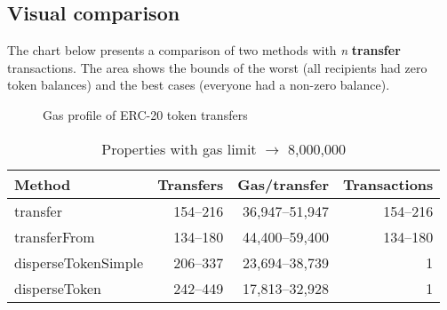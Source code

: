 \documentclass[12pt]{article}
\begin{document}
\subsection{Visual comparison}

The chart below presents a comparison of two methods with \textit{n} \textbf{transfer} transactions.
The area shows the bounds of the worst (all recipients had zero token balances) and the best cases (everyone had a non-zero balance).



\begin{figure}[h!]
\caption{Gas profile of ERC-20 token transfers}
\end{figure}

\begin{table}[h]
\caption{Properties with gas limit $\rightarrow$ 8,000,000}
\label{table-byzantium}
\begin{center}
\begin{tabular}{lrrr}
Method & Transfers & Gas/transfer & Transactions \\ \midrule
transfer & 154--216 & 36,947--51,947 & 154--216 \\
transferFrom & 134--180 & 44,400--59,400 & 134--180 \\
disperseTokenSimple & 206--337 & 23,694--38,739 & 1 \\
disperseToken & 242--449 & 17,813--32,928 & 1
\end{tabular}
\end{center}
\end{table}
\end{document}
